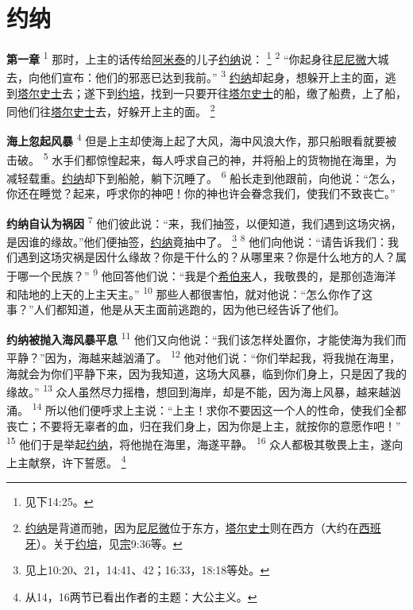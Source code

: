 \chapter*{约纳}


\textbf{第一章\quad}
\textsuperscript{1}
那时，上主的话传给\uline{阿米泰}的儿子\uline{约纳}说：
\footnote{见下14:25。}
\textsuperscript{2}
“你起身往\uline{尼尼微}大城去，向他们宣布：他们的邪恶已达到我前。”
\textsuperscript{3}
\uline{约纳}却起身，想躲开上主的面，逃到\uline{塔尔史士}去；遂下到\uline{约培}，找到一只要开往\uline{塔尔史士}的船，缴了船费，上了船，同他们往\uline{塔尔史士}去，好躲开上主的面。
\footnote{\uline{约纳}是背道而驰，因为\uline{尼尼微}位于东方，\uline{塔尔史士}则在西方（大约在\uline{西班牙}）。关于\uline{约培}，见\uline{宗}9:36等。}

\textbf{海上忽起风暴\quad}
\textsuperscript{4}
但是上主却使海上起了大风，海中风浪大作，那只船眼看就要被击破。
\textsuperscript{5}
水手们都惊惶起来，每人呼求自己的神，并将船上的货物抛在海里，为减轻载重。\uline{约纳}却下到船舱，躺下沉睡了。
\textsuperscript{6}
船长走到他跟前，向他说：“怎么，你还在睡觉？起来，呼求你的神吧！你的神也许会眷念我们，使我们不致丧亡。”

\textbf{约纳自认为祸因\quad}
\textsuperscript{7}
他们彼此说：“来，我们抽签，以便知道，我们遇到这场灾祸，是因谁的缘故。”他们便抽签，\uline{约纳}竟抽中了。
\footnote{见上10:20、21，14:41、42；16:33，18:18等处。}
\textsuperscript{8}
他们向他说：“请告诉我们：我们遇到这场灾祸是因什么缘故？你是干什么的？从哪里来？你是什么地方的人？属于哪一个民族？”
\textsuperscript{9}
他回答他们说：“我是个\uline{希伯来}人，我敬畏的，是那创造海洋和陆地的上天的上主天主。”
\textsuperscript{10}
那些人都很害怕，就对他说：“怎么你作了这事？”人们都知道，他是从天主面前逃跑的，因为他已经告诉了他们。

\textbf{约纳被抛入海风暴平息\quad}
\textsuperscript{11}
他们又向他说：“我们该怎样处置你，才能使海为我们而平静？”因为，海越来越汹涌了。
\textsuperscript{12}
他对他们说：“你们举起我，将我抛在海里，海就会为你们平静下来，因为我知道，这场大风暴，临到你们身上，只是因了我的缘故。”
\textsuperscript{13}
众人虽然尽力摇橹，想回到海岸，却是不能，因为海上风暴，越来越汹涌。
\textsuperscript{14}
所以他们便呼求上主说：“上主！求你不要因这一个人的性命，使我们全都丧亡；不要将无辜者的血，归在我们身上，因为你是上主，就按你的意愿作吧！”
\textsuperscript{15}
他们于是举起\uline{约纳}，将他抛在海里，海遂平静。
\textsuperscript{16}
众人都极其敬畏上主，遂向上主献祭，许下誓愿。
\footnote{从14，16两节已看出作者的主题：大公主义。}

